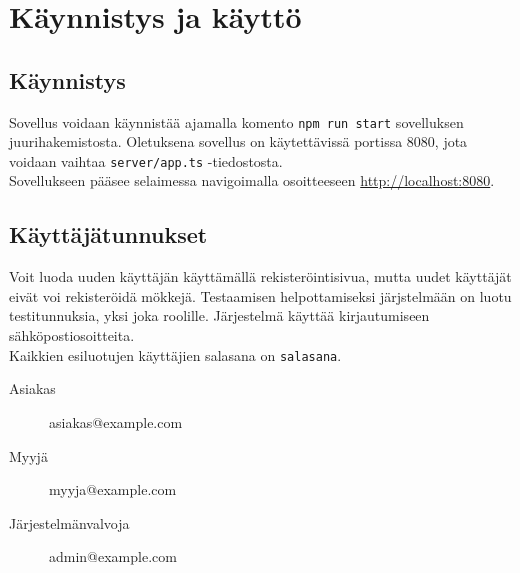 \chapter{Käynnistys ja käyttö}

\section{Käynnistys}

Sovellus voidaan käynnistää ajamalla komento \texttt{npm run start} sovelluksen juurihakemistosta. Oletuksena sovellus on käytettävissä portissa 8080, jota voidaan vaihtaa \texttt{server/app.ts} -tiedostosta.\\

Sovellukseen pääsee selaimessa navigoimalla osoitteeseen \href{http://localhost:8080}{http://localhost:8080}.

\section{Käyttäjätunnukset}

Voit luoda uuden käyttäjän käyttämällä rekisteröintisivua, mutta uudet käyttäjät eivät voi rekisteröidä mökkejä. Testaamisen helpottamiseksi järjstelmään on luotu testitunnuksia, yksi joka roolille. Järjestelmä käyttää kirjautumiseen sähköpostiosoitteita.\\

\noindent
Kaikkien esiluotujen käyttäjien salasana on \texttt{salasana}.\\

\begin{description}
	\item[Asiakas] asiakas@example.com
	\item[Myyjä] myyja@example.com
	\item[Järjestelmänvalvoja] admin@example.com
\end{description}